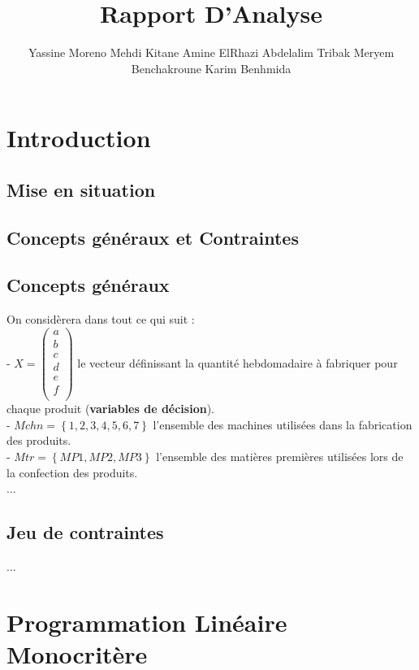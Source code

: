 \documentclass[a4paper, 11pt]{article}
\title{Rapport D'Analyse}
\author{Yassine Moreno \cr Mehdi Kitane \cr Amine ElRhazi \cr Abdelalim Tribak \cr Meryem Benchakroune \cr Karim Benhmida}
\begin{document}
\begin{LARGE}
\maketitle
\end{LARGE}

\tableofcontents
\newpage

\section{Introduction}
\subsection{Mise en situation}
\subsection{Concepts généraux et Contraintes}
\subsection*{Concepts généraux}
On considèrera dans tout ce qui suit : \\
- $X = \begin{pmatrix}
        a\\
        b\\
        c\\
        d\\
        e\\
        f\\
    \end{pmatrix}$ le vecteur définissant la quantité hebdomadaire à fabriquer pour chaque produit (\textbf{variables de décision}).\\
- $Mchn = \left\{1, 2, 3, 4, 5, 6, 7\right\}$ l'ensemble des machines utilisées dans la fabrication des produits.\\
- $Mtr = \left\{MP1,MP2,MP3\right\}$ l'ensemble des matières premières utilisées lors de la confection des produits.\\
...
\subsection*{Jeu de contraintes}
... \\
\section{Programmation Linéaire Monocritère}
\end{document}
